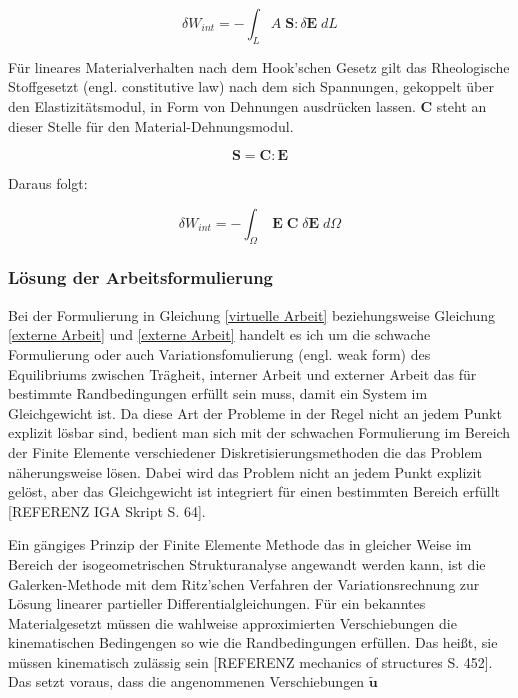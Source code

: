 \documentclass[german,a4paper,12pt,oneside]{scrbook}
\theoremstyle{definition}
\theoremstyle{definition}
\theoremstyle{definition}
\theoremstyle{definition}
\theoremstyle{definition}
\theoremstyle{definition}
\begin{document}
\begin{equation}
    \delta W_{int} = - \int_{L}^{} A \; \bm{S} : \delta \bm{E} \; dL
\end{equation}

\vspace{0.5cm}
Für lineares Materialverhalten nach dem Hook'schen Gesetz gilt das Rheologische Stoffgesetzt (engl. constitutive law) nach dem sich Spannungen, gekoppelt über den Elastizitätsmodul, in Form von Dehnungen ausdrücken lassen. $\bm{C}$ steht an dieser Stelle für den Material-Dehnungsmodul.


\begin{equation}
    \bm{S} = \bm{C} : \bm{E}
\end{equation}

\vspace{0.5cm}
Daraus folgt: 

\begin{equation}
    \delta W_{int} = - \int_{\Omega}^{} \; \bm{E} \; \bm{C} \; \delta \bm{E} \; d\Omega
\end{equation}



\vspace{0.5cm}
\LARGE
\subsubsection{Lösung der Arbeitsformulierung}

\vspace{0.5cm}
\normalsize
Bei der Formulierung in Gleichung \eqref{virtuelle Arbeit} beziehungsweise Gleichung \eqref{externe Arbeit} und \eqref{externe Arbeit} handelt es ich um die schwache Formulierung oder auch Variationsfomulierung (engl. weak form) des Equilibriums zwischen Trägheit, interner Arbeit und externer Arbeit das für bestimmte Randbedingungen erfüllt sein muss, damit ein System im Gleichgewicht ist. Da diese Art der Probleme in der Regel nicht an jedem Punkt explizit lösbar sind, bedient man sich mit der schwachen Formulierung im Bereich der Finite Elemente verschiedener Diskretisierungsmethoden die das Problem näherungsweise lösen. Dabei wird das Problem nicht an jedem Punkt explizit gelöst, aber das Gleichgewicht ist integriert für einen bestimmten Bereich erfüllt [REFERENZ IGA Skript S. 64].

Ein gängiges Prinzip der Finite Elemente Methode das in gleicher Weise im Bereich der isogeometrischen Strukturanalyse angewandt werden kann, ist die Galerken-Methode mit dem Ritz'schen Verfahren der Variationsrechnung zur Lösung linearer partieller Differentialgleichungen. Für ein bekanntes Materialgesetzt müssen die wahlweise approximierten Verschiebungen die kinematischen Bedingengen so wie die Randbedingungen erfüllen. Das heißt, sie müssen kinematisch zulässig sein [REFERENZ mechanics of structures S. 452]. Das setzt voraus, dass die angenommenen Verschiebungen $\tilde{\bm{u}}$
\end{document}
